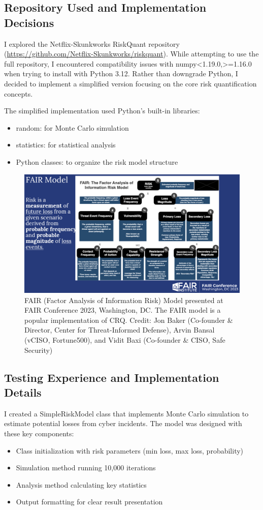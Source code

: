 \subsection{Repository Used and Implementation Decisions}
I explored the Netflix-Skunkworks RiskQuant repository 
(\url{https://github.com/Netflix-Skunkworks/riskquant}). While attempting to use 
the full repository, I encountered compatibility issues with numpy<1.19.0,>=1.16.0 
when trying to install with Python 3.12. Rather than downgrade Python, I decided to 
implement a simplified version focusing on the core risk quantification concepts.

The simplified implementation used Python's built-in libraries:
\begin{itemize}
    \item random: for Monte Carlo simulation
    \item statistics: for statistical analysis
    \item Python classes: to organize the risk model structure
\end{itemize}

\begin{figure}[h]
    \centering
    \includegraphics[width=\textwidth]{images/fair_model.png}
    \caption{FAIR (Factor Analysis of Information Risk) Model presented at FAIR Conference 2023, Washington, DC. The FAIR model is a popular implementation of CRQ.
    Credit: Jon Baker (Co-founder \& Director, Center for Threat-Informed Defense), 
    Arvin Bansal (vCISO, Fortune500), and Vidit Baxi (Co-founder \& CISO, Safe Security)}
    \label{fig:fair-model}
\end{figure}

\subsection{Testing Experience and Implementation Details}
I created a SimpleRiskModel class that implements Monte Carlo simulation to estimate 
potential losses from cyber incidents. The model was designed with these key components:
\begin{itemize}
    \item Class initialization with risk parameters (min loss, max loss, probability)
    \item Simulation method running 10,000 iterations
    \item Analysis method calculating key statistics
    \item Output formatting for clear result presentation
\end{itemize}

